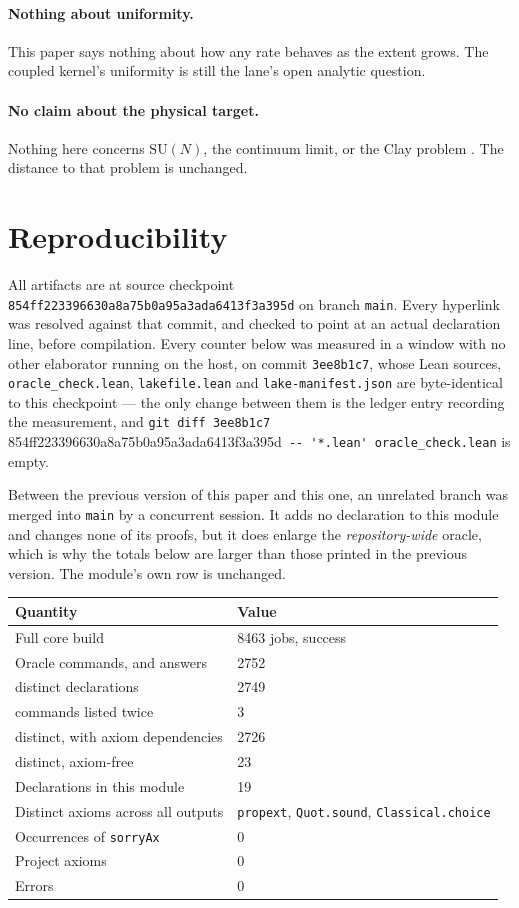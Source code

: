 \documentclass[11pt]{article}
\theoremstyle{definition}
\newcommand{\anchor}{854ff223396630a8a75b0a95a3ada6413f3a395d}
\newcommand{\SU}{\mathrm{SU}}
\begin{document}
\paragraph{Nothing about uniformity.}  This paper says nothing about how any
rate behaves as the extent grows.  The coupled kernel's uniformity is still the
lane's open analytic question.

\paragraph{No claim about the physical target.}  Nothing here concerns $\SU(N)$,
the continuum limit, or the Clay problem \cite{Clay}.  The distance to that
problem is unchanged.

\section{Reproducibility}\label{sec:repro}

All artifacts are at source checkpoint \texttt{\anchor} on branch \texttt{main}.
Every hyperlink was resolved against that commit, and checked to point at an
actual declaration line, before compilation.  Every counter below was measured
in a window with no other elaborator running on the host, on commit
\texttt{3ee8b1c7}, whose Lean sources, \texttt{oracle\_check.lean},
\texttt{lakefile.lean} and \texttt{lake-manifest.json} are byte-identical to this
checkpoint --- the only change between them is the ledger entry recording the
measurement, and
\verb|git diff 3ee8b1c7 |\anchor\verb| -- '*.lean' oracle_check.lean| is empty.

Between the previous version of this paper and this one, an unrelated branch was
merged into \texttt{main} by a concurrent session.  It adds no declaration to
this module and changes none of its proofs, but it does enlarge the
\emph{repository-wide} oracle, which is why the totals below are larger than
those printed in the previous version.  The module's own row is unchanged.

\begin{center}
\begin{tabular}{ll}
\toprule
Quantity & Value \\
\midrule
Full core build & 8463 jobs, success \\
Oracle commands, and answers & 2752 \\
\quad distinct declarations & 2749 \\
\quad commands listed twice & 3 \\
\quad distinct, with axiom dependencies & 2726 \\
\quad distinct, axiom-free & 23 \\
Declarations in this module & 19 \\
Distinct axioms across all outputs & \texttt{propext}, \texttt{Quot.sound}, \texttt{Classical.choice} \\
Occurrences of \texttt{sorryAx} & 0 \\
Project axioms & 0 \\
Errors & 0 \\
\bottomrule
\end{tabular}
\end{center}
\end{document}
